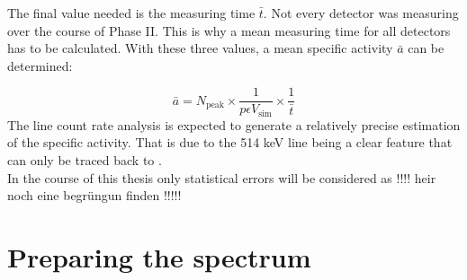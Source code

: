 \documentclass[encoding=utf8,british]{tumphthesis}
\begin{document}
The final value needed is the measuring time $\bar{t}$.
Not every detector was measuring over the course of Phase II.
This is why a mean measuring time for all detectors has to be calculated.
With these three values, a mean specific activity $\bar{a}$ can be determined:

\begin{equation}
    \bar{a} = N_{\mathrm{peak}}\times\frac{1}{p \epsilon V_{\mathrm{sim}}}\times\frac{1}{\bar{t}}
    \label{equ:activityDieErste}
\end{equation}
The line count rate analysis is expected to generate a relatively precise estimation of the specific activity.
That is due to the 514 keV line being a clear feature that can only be traced back to \Kr.
\\

In the course of this thesis only statistical errors will be considered as 
!!!! heir noch eine begrüngun finden !!!!!

\section{Preparing the spectrum}
\end{document}
